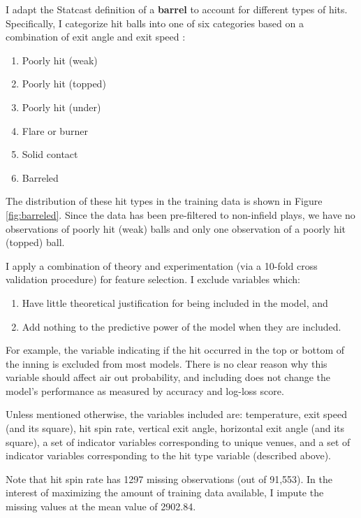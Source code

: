 I adapt the Statcast definition of a \textbf{barrel} to account for different types of hits. Specifically, I categorize hit balls into one of six categories based on a combination of exit angle and exit speed \cite{chamberlain}:

\begin{enumerate}
  \item Poorly hit (weak)
  \item Poorly hit (topped)
  \item Poorly hit (under)
  \item Flare or burner
  \item Solid contact
  \item Barreled
\end{enumerate}

The distribution of these hit types in the training data is shown in Figure \ref{fig:barreled}. Since the data has been pre-filtered to non-infield plays, we have no observations of poorly hit (weak) balls and only one observation of a poorly hit (topped) ball.

I apply a combination of theory and experimentation (via a 10-fold cross validation procedure) for feature selection. I exclude variables which:
\begin{enumerate}
  \item Have little theoretical justification for being included in the model, and
  \item Add nothing to the predictive power of the model when they are included.
\end{enumerate}
For example, the variable indicating if the hit occurred in the top or bottom of the inning is excluded from most models. There is no clear reason why this variable should affect air out probability, and including does not change the model's performance as measured by accuracy and log-loss score.

Unless mentioned otherwise, the variables included are: temperature, exit speed (and its square), hit spin rate, vertical exit angle, horizontal exit angle (and its square), a set of indicator variables corresponding to unique venues, and a set of indicator variables corresponding to the hit type variable (described above).

Note that hit spin rate has 1297 missing observations (out of 91,553). In the interest of maximizing the amount of training data available, I impute the missing values at the mean value of 2902.84.


